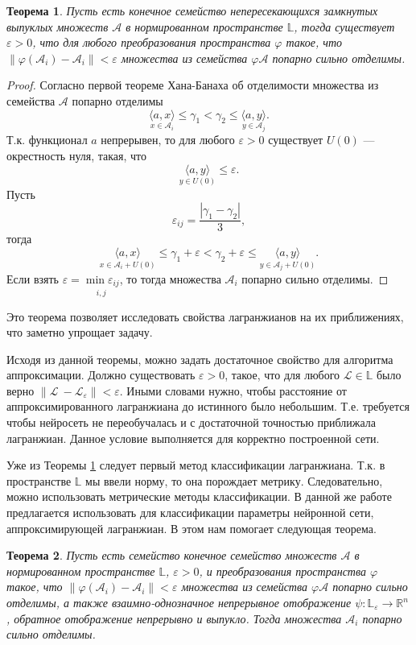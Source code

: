 \documentclass[a4paper, 12pt]{article}
\renewcommand{\epsilon}{\ensuremath{\varepsilon}}
\renewcommand{\phi}{\ensuremath{\varphi}}
\renewcommand{\leq}{\ensuremath{\leqslant}}
\newtheorem{theorem}{Теорема}
\begin{document}
\begin{theorem} \label{main_theorem}
Пусть есть конечное семейство непересекающихся замкнутых выпуклых множеств $\mathcal{A}$ в нормированном пространстве $\mathbb{L}$, тогда существует $\epsilon > 0$, что для любого преобразования пространства $\phi$ такое, что $\|\phi(\mathcal{A}_{i}) - \mathcal{A}_{i}\| < \epsilon$ множества из семейства $\phi{\mathcal{A}}$ попарно сильно отделимы.
\end{theorem}

\begin{proof}
Согласно первой теореме Хана-Банаха об отделимости множества из семейства $\mathcal{A}$ попарно отделимы
\[ 
\underset{x \in \mathcal{A}_{i}}{\langle a, x \rangle}\leq \gamma_{1} < \gamma_{2} \leq \underset{y \in \mathcal{A}_{j}}{\langle a, y \rangle}.
\]
Т.к. функционал $a$ непрерывен, то для любого $\epsilon > 0$ существует $U(0)$ — окрестность нуля, такая, что 
\[
\underset{y \in U(0)}{\langle a, y \rangle} \leq \epsilon.
\]
Пусть 
\[
\epsilon_{ij} = \frac{|\gamma_{1} - \gamma_{2}|}{3},\]
тогда
\[
\underset{x \in \mathcal{A}_{i} + U(0)}{\langle a, x \rangle}\leq \gamma_{1} + \epsilon < \gamma_{2} + \epsilon \leq \underset{y \in \mathcal{A}_{j} + U(0)}{\langle a, y \rangle}.\]
Если взять $\epsilon = \underset{i, j}{\min{\epsilon_{ij}}}$, то тогда множества $\mathcal{A}_{i}$ попарно сильно отделимы. 
\end{proof}

Это теорема позволяет исследовать свойства лагранжианов на их приближениях, что заметно упрощает задачу.

Исходя из данной теоремы, можно задать достаточное свойство для алгоритма аппроксимации. Должно существовать $\epsilon > 0$, такое, что для любого $\mathcal{L} \in \mathbb{L}$ было верно $\|\mathcal{L}\ - \mathcal{L}_{\epsilon}\| < \epsilon$. Иными словами нужно, чтобы расстояние от аппроксимированного лагранжиана до истинного было небольшим. Т.е. требуется чтобы нейросеть не переобучалась и с достаточной точностью приближала лагранжиан. Данное условие выполняется для корректно построенной сети.

Уже из Теоремы \ref{main_theorem} следует первый метод классификации лагранжиана. Т.к. в пространстве $\mathbb{L}$
мы ввели норму, то она порождает метрику. Следовательно, можно использовать метрические методы классификации. В данной же работе предлагается использовать для классификации параметры нейронной сети, аппроксимирующей лагранжиан. В этом нам помогает следующая теорема.

\begin{theorem} \label{r_theorem}
Пусть есть семейство конечное семейство множеств $\mathcal{A}$ в нормированном пространстве $\mathbb{L}$, $\epsilon > 0$, и преобразования пространства $\phi$ такое, что $\|\phi(\mathcal{A}_{i}) - \mathcal{A}_{i}\| < \epsilon$ множества из семейства $\phi{\mathcal{A}}$ попарно сильно отделимы, а также взаимно-однозначное непрерывное отображение $\psi: \mathbb{L}_{\epsilon} \rightarrow \mathbb{R}^{n}$, обратное отображение непрерывно и выпукло. Тогда множества $\mathcal{A}_{i}$ попарно сильно отделимы.
\end{theorem}
\end{document}
